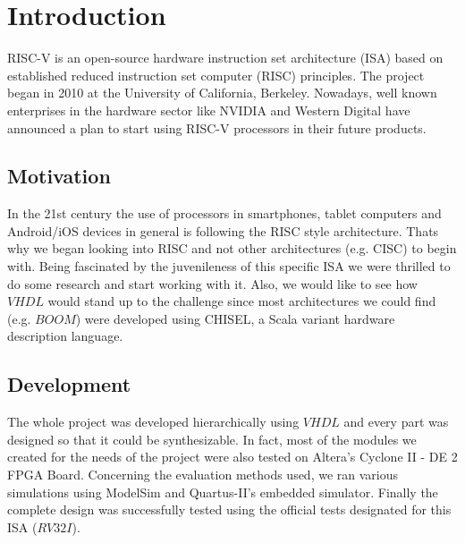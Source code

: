 



%

\chapterfont{\raggedleft}
\chapter{Introduction}

	\minitoc 
	\vspace{5mm}
	RISC-V is an open-source hardware instruction set architecture (ISA) based on established reduced instruction set computer (RISC) principles. The project began in 2010 at the University of California, Berkeley. Nowadays, well known enterprises in the hardware sector like NVIDIA and Western Digital have announced a plan to start using RISC-V processors in their future products.
	\section{Motivation}

	\label{sec:Motivation}
	
	In the 21st century the use of processors in smartphones, tablet computers and Android/iOS devices in general is following the RISC style architecture. Thats why we began looking into RISC and not other architectures (e.g. CISC) to begin with. Being fascinated by the juvenileness of this specific ISA we were thrilled to do some research and start working with it. 
	Also, we would like to see how $VHDL$ would stand up to the challenge since most architectures we could find (e.g. $BOOM$) were developed using CHISEL, a Scala variant hardware description language.
	
	\section{Development}
	\label{sec:Dev}
	The whole project was developed hierarchically using $VHDL$ and every part was designed so that it could be synthesizable. In fact, most of the modules we created for the needs of the project were also tested on Altera's Cyclone II - DE 2 FPGA Board. Concerning the evaluation methods used, we ran various simulations using ModelSim and Quartus-II's embedded simulator. Finally the complete design was successfully tested using the official tests designated for this ISA ($RV32I$).
